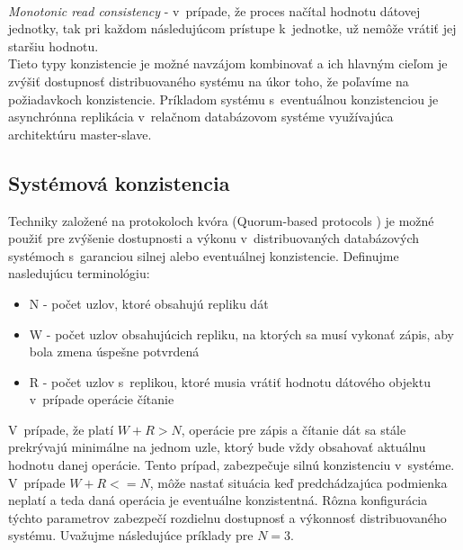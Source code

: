\documentclass[11pt,twoside,a4paper]{book}
\begin{document}
\noindent 
\\
\emph{Monotonic read consistency} - v~prípade, že proces načítal hodnotu dátovej jednotky, tak pri každom následujúcom prístupe k~jednotke, už nemôže vrátiť jej staršiu hodnotu. \\



Tieto typy konzistencie je možné navzájom kombinovať a ich hlavným cieľom je zvýšiť dostupnosť distribuovaného systému na úkor toho, že poľavíme na požiadavkoch konzistencie. Príkladom systému s~eventuálnou konzistenciou je asynchrónna replikácia v~relačnom databázovom systéme využívajúca architektúru master-slave.

\subsection{Systémová konzistencia}
\label{section:Consistency}
Techniky založené na protokoloch kvóra (Quorum-based protocols \cite{gifford1979weighted}) je možné použiť pre zvýšenie dostupnosti a výkonu v~distribuovaných databázových systémoch s~garanciou silnej alebo eventuálnej konzistencie. Definujme nasledujúcu terminológiu:
\begin{itemize}
 \item N - počet uzlov, ktoré obsahujú repliku dát
 \item W - počet uzlov obsahujúcich repliku, na ktorých sa musí vykonať zápis, aby bola zmena úspešne potvrdená
 \item R - počet uzlov s~replikou, ktoré musia vrátiť hodnotu dátového objektu v~prípade operácie čítanie
\end{itemize}

V~prípade, že platí $W + R > N$, operácie pre zápis a čítanie dát sa stále prekrývajú minimálne na jednom uzle, ktorý bude vždy obsahovať aktuálnu hodnotu danej operácie. Tento prípad, zabezpečuje silnú konzistenciu v~systéme. V~prípade $W + R <= N$, môže nastať situácia keď predchádzajúca podmienka neplatí a teda daná operácia je eventuálne konzistentná. Rôzna konfigurácia týchto parametrov zabezpečí rozdielnu dostupnosť a výkonnosť distribuovaného systému.  Uvažujme následujúce príklady pre $N = 3$.
\end{document}
